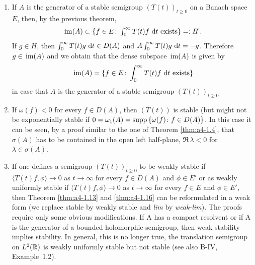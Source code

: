 \begin{remark}\label{rem:a4-1.17}
\begin{enumerate}[\upshape (i), wide, labelsep=1em]
\item 
If $A$ is the generator of a stable semigroup
$(T(t))_{t \geq 0}$ on a Banach space $E$, then, by the previous theorem,
\[\textstyle{
\mathop{}\mathrm{im}(A) \subset \{f \in E\colon\int_{0}^{\infty} T(t)f \,\mathop{}\!\mathrm{d}{t}\text{ exists}\} =: H\,.
}\]
If $g \in H$, then $\int_{0}^{\infty} T(t)g \,\mathop{}\!\mathrm{d}{t} \in D(A)$ and $A \int_{0}^{\infty} T(t)g \,\mathop{}\!\mathrm{d}{t} = -g$. 
Therefore $g \in \mathop{}\mathrm{im}(A)$ and we obtain that the dense subspace $\mathop{}\mathrm{im}(A)$ is given
by
\begin{equation}\label{eq:a4-1.14}
\mathop{}\mathrm{im}(A) = \{f \in E\colon\int_{0}^{\infty} T(t)f \,\mathop{}\!\mathrm{d}{t} \text{ exists}\}
\end{equation}
in case that $A$ is the generator of a stable semigroup $(T(t))_{t \geq 0}$

\item 
If $\omega(f) < 0$ for every $f \in D(A)$, then $(T(t))$ is stable (but
might not be exponentially stable if
$0 = \omega_{1}(A) = \mathop{}\!\mathrm{supp}\,\{\omega(f) \colon f \in D(A)\}$. 
In this case it can be seen, by a
proof similar to the one of Theorem \ref{thm:a4-1.4}, that $\sigma(A)$ has to be contained
in the open left half-plane, \ie $\Re\,\lambda < 0$ for $\lambda \in \sigma(A)$.

\item 
If one defines a semigroup $(T(t))_{t \geq 0}$ to be weakly stable if
$\langle T(t)f,\phi \rangle \to 0$ as $t \to \infty$ for every $f \in D(A)$ and $\phi \in E'$ or as
weakly uniformly stable if $\langle T(t)f,\phi \rangle \to 0$ as $t \to \infty$ for every $f \in E$
and $\phi \in E'$, then Theorem \ref{thm:a4-1.13} and \ref{thm:a4-1.16} can be reformulated in a weak form (\ie we replace stable by weakly stable and \emph{lim} by
\emph{weak-lim}). 
The proofs require only some obvious modifications.
If A has a compact resolvent or if A is the generator of a bounded
holomorphic semigroup, then weak stability implies stability. 
In general, this is no longer true, \eg the translation semigroup on
$L^{2}(\mathbb{R})$ is weakly uniformly stable but not stable (see also B-IV, Example~1.2).
\end{enumerate}
\end{remark}
